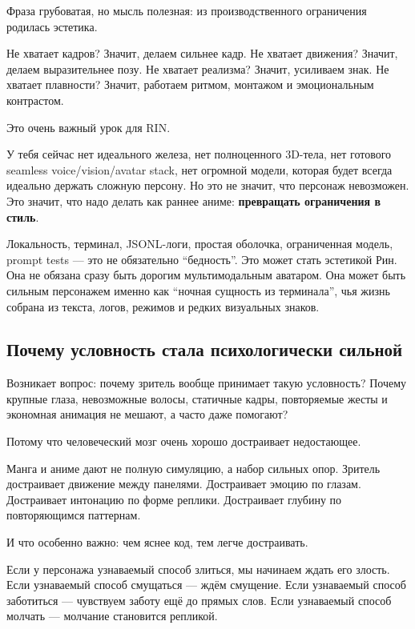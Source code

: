 Фраза грубоватая, но мысль полезная: из производственного ограничения
родилась эстетика.

Не хватает кадров? Значит, делаем сильнее кадр. Не хватает движения?
Значит, делаем выразительнее позу. Не хватает реализма? Значит,
усиливаем знак. Не хватает плавности? Значит, работаем ритмом, монтажом
и эмоциональным контрастом.

Это очень важный урок для RIN.

У тебя сейчас нет идеального железа, нет полноценного 3D-тела, нет
готового seamless voice/\hspace{0pt}vision/\hspace{0pt}avatar stack, нет огромной модели,
которая будет всегда идеально держать сложную персону. Но это не значит,
что персонаж невозможен. Это значит, что надо делать как раннее аниме:
\textbf{превращать ограничения в стиль}.

Локальность, терминал, JSONL-логи, простая оболочка, ограниченная
модель, prompt tests --- это не обязательно ``бедность''. Это может
стать эстетикой Рин. Она не обязана сразу быть дорогим мультимодальным
аватаром. Она может быть сильным персонажем именно как ``ночная сущность
из терминала'', чья жизнь собрана из текста, логов, режимов и редких
визуальных знаков.

\subsection*{Почему условность стала психологически сильной}

Возникает вопрос: почему зритель вообще принимает такую условность?
Почему крупные глаза, невозможные волосы, статичные кадры, повторяемые
жесты и экономная анимация не мешают, а часто даже помогают?

Потому что человеческий мозг очень хорошо достраивает недостающее.

Манга и аниме дают не полную симуляцию, а набор сильных опор. Зритель
достраивает движение между панелями. Достраивает эмоцию по глазам.
Достраивает интонацию по форме реплики. Достраивает глубину по
повторяющимся паттернам.

И что особенно важно: чем яснее код, тем легче достраивать.

Если у персонажа узнаваемый способ злиться, мы начинаем ждать его
злость. Если узнаваемый способ смущаться --- ждём смущение. Если
узнаваемый способ заботиться --- чувствуем заботу ещё до прямых слов.
Если узнаваемый способ молчать --- молчание становится репликой.

